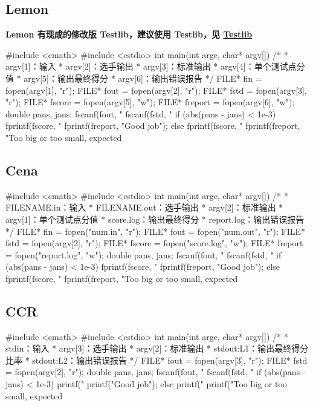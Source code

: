 \subsection{Lemon}

\textbf{Lemon 有现成的修改版 Testlib，建议使用 Testlib，见 \href{#testlib}{Testlib}}

\begin{cppcode}
#include <cmath>
#include <cstdio>
int main(int argc, char* argv[]) {
  /*
   * argv[1]：输入
   * argv[2]：选手输出
   * argv[3]：标准输出
   * argv[4]：单个测试点分值
   * argv[5]：输出最终得分
   * argv[6]：输出错误报告
   */
  FILE* fin = fopen(argv[1], "r");
  FILE* fout = fopen(argv[2], "r");
  FILE* fstd = fopen(argv[3], "r");
  FILE* fscore = fopen(argv[5], "w");
  FILE* freport = fopen(argv[6], "w");
  double pans, jans;
  fscanf(fout, "%
  fscanf(fstd, "%
  if (abs(pans - jans) < 1e-3) {
    fprintf(fscore, "%
    fprintf(freport, "Good job");
  } else {
    fprintf(fscore, "%
    fprintf(freport, "Too big or too small, expected %
  }
}
\end{cppcode}

\subsection{Cena}

\begin{cppcode}
#include <cmath>
#include <cstdio>
int main(int argc, char* argv[]) {
  /*
   * FILENAME.in：输入
   * FILENAME.out：选手输出
   * argv[2]：标准输出
   * argv[1]：单个测试点分值
   * score.log：输出最终得分
   * report.log：输出错误报告
   */
  FILE* fin = fopen("num.in", "r");
  FILE* fout = fopen("num.out", "r");
  FILE* fstd = fopen(argv[2], "r");
  FILE* fscore = fopen("score.log", "w");
  FILE* freport = fopen("report.log", "w");
  double pans, jans;
  fscanf(fout, "%
  fscanf(fstd, "%
  if (abs(pans - jans) < 1e-3) {
    fprintf(fscore, "%
    fprintf(freport, "Good job");
  } else {
    fprintf(fscore, "%
    fprintf(freport, "Too big or too small, expected %
  }
}
\end{cppcode}

\subsection{CCR}

\begin{cppcode}
#include <cmath>
#include <cstdio>
int main(int argc, char* argv[]) {
  /*
   * stdin：输入
   * argv[3]：选手输出
   * argv[2]：标准输出
   * stdout:L1：输出最终得分比率
   * stdout:L2：输出错误报告
   */
  FILE* fout = fopen(argv[3], "r");
  FILE* fstd = fopen(argv[2], "r");
  double pans, jans;
  fscanf(fout, "%
  fscanf(fstd, "%
  if (abs(pans - jans) < 1e-3) {
    printf("%
    printf("Good job");
  } else {
    printf("%
    printf("Too big or too small, expected %
  }
}
\end{cppcode}

